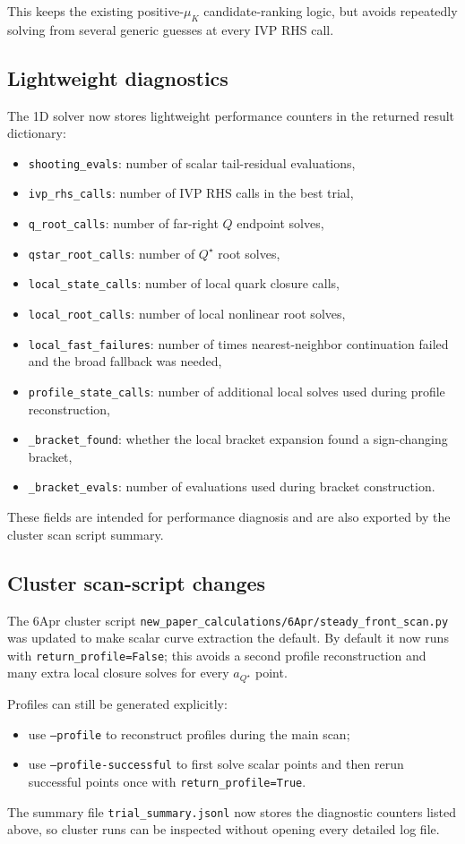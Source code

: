 \documentclass[11pt]{article}
\begin{document}
This keeps the existing positive-$\mu_K$ candidate-ranking logic, but avoids
repeatedly solving from several generic guesses at every IVP RHS call.

\subsection{Lightweight diagnostics}
The 1D solver now stores lightweight performance counters in the returned result
dictionary:
\begin{itemize}[leftmargin=1.5em]
\item \texttt{shooting\_evals}: number of scalar tail-residual evaluations,
\item \texttt{ivp\_rhs\_calls}: number of IVP RHS calls in the best trial,
\item \texttt{q\_root\_calls}: number of far-right $Q$ endpoint solves,
\item \texttt{qstar\_root\_calls}: number of $Q^\star$ root solves,
\item \texttt{local\_state\_calls}: number of local quark closure calls,
\item \texttt{local\_root\_calls}: number of local nonlinear root solves,
\item \texttt{local\_fast\_failures}: number of times nearest-neighbor
      continuation failed and the broad fallback was needed,
\item \texttt{profile\_state\_calls}: number of additional local solves used
      during profile reconstruction,
\item \texttt{\_bracket\_found}: whether the local bracket expansion found a
      sign-changing bracket,
\item \texttt{\_bracket\_evals}: number of evaluations used during bracket
      construction.
\end{itemize}
These fields are intended for performance diagnosis and are also exported by the
cluster scan script summary.

\subsection{Cluster scan-script changes}
The 6Apr cluster script \texttt{new\_paper\_calculations/6Apr/steady\_front\_scan.py}
was updated to make scalar curve extraction the default. By default it now runs
with \texttt{return\_profile=False}; this avoids a second profile reconstruction
and many extra local closure solves for every $a_{Q^\star}$ point.

Profiles can still be generated explicitly:
\begin{itemize}[leftmargin=1.5em]
\item use \texttt{--profile} to reconstruct profiles during the main scan;
\item use \texttt{--profile-successful} to first solve scalar points and then
      rerun successful points once with \texttt{return\_profile=True}.
\end{itemize}
The summary file \texttt{trial\_summary.jsonl} now stores the diagnostic counters
listed above, so cluster runs can be inspected without opening every detailed
log file.
\end{document}
